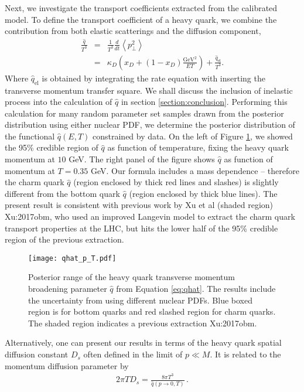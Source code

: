 Next, we investigate the transport coefficients extracted from the calibrated model.
To define the transport coefficient of a heavy quark,
we combine the contribution from both elastic scatterings and the diffusion component,
\begin{eqnarray}\label{eq:qhat}
\frac{\hat{q}}{T^3} &=& \frac{1}{T^3}\frac{d}{dt}\left\langle p_\perp^2 \right\rangle\\
\nonumber
 &=&  \kappa_D\left(x_D + (1-x_D)\frac{\textrm{GeV}^2}{ET}\right) + \frac{\hat{q}_{\textrm{el}}}{T^3}.
\end{eqnarray}
Where $\hat{q}_{\textrm{el}}$ is obtained by integrating the rate equation with inserting the transverse momentum transfer square.
We shall discuss the inclusion of inelastic process into the calculation of $\hat{q}$ in section \ref{section:conclusion}.
Performing this calculation for many random parameter set samples drawn from the posterior distribution using either nuclear PDF, we determine the posterior distribution of the functional $\hat{q}(E, T)$ constrained by data.
On the left of Figure \ref{plots:posterior_qhat}, we showed the 95\% credible region of $\hat{q}$ as function of temperature, fixing the heavy quark momentum at $10$ GeV.
The right panel of the figure shows $\hat{q}$ as function of momentum at $T=0.35$ GeV.
Our formula includes a mass dependence -- therefore  the charm quark $\hat{q}$ (region enclosed by thick red lines and slashes) is slightly different from the bottom quark $\hat{q}$ (region enclosed by thick blue lines).
The present result is consistent with previous work by Xu et al (shaded region) {Xu:2017obm}, who used an improved Langevin model to extract the charm quark transport properties at the LHC,  but hits the lower half of the 95\% credible region of the previous extraction.
\begin{figure}
\texttt{[image: qhat\_p\_T.pdf]}
\caption{Posterior range of the heavy quark transverse momentum broadening parameter $\hat{q}$ from Equation \ref{eq:qhat}. The results include the uncertainty from using different nuclear PDFs. Blue boxed region is for bottom quarks and red slashed region for charm quarks. The shaded region indicates a previous extraction {Xu:2017obm}.}\label{plots:posterior_qhat}
\end{figure}
Alternatively, one can present our results in terms of the heavy quark spatial diffusion constant $D_s$ often defined in the limit of $p\ll M$.
It is related to the momentum diffusion parameter by
\begin{eqnarray}
2\pi T D_s = \frac{8\pi T^3}{\hat{q}(p\rightarrow 0, T)} \, .
\end{eqnarray}
